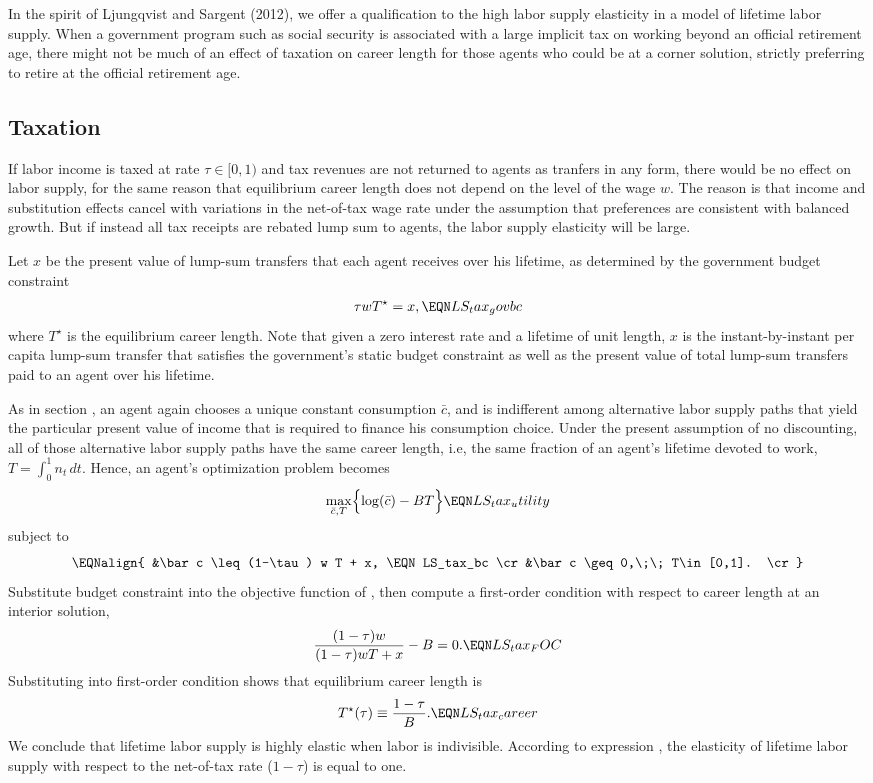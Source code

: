 In the spirit of  Ljungqvist and Sargent (2012), we offer a
qualification to the high labor supply elasticity in a model of
lifetime labor supply. When a government program such as social
security is associated with a large implicit tax on working beyond an
official retirement age, there might not be much of an effect of
taxation on career length for those agents who could be at a corner
solution, strictly preferring to retire at the official
retirement age.



\subsection{Taxation}\label{sec:LS_tax}%
If labor income is taxed at rate $\tau\in [0,1)$ and tax revenues
are not returned to agents as tranfers in any form, there would
be no effect on labor supply, for the same reason that equilibrium
career length  does not depend on the level of the
wage $w$. The reason is that income and substitution effects cancel
with variations in the net-of-tax wage rate under the assumption
that preferences are consistent with balanced growth. But if instead
all tax receipts are rebated lump sum to agents, the labor supply
elasticity will be large.

Let $x$ be the present value of lump-sum transfers that each agent
receives over his lifetime, as determined by the government budget
constraint
$$
\tau w T^\star  = x,                             \EQN LS_tax_govbc
$$
where $T^\star$ is the equilibrium career length. Note that given a
zero interest rate and a lifetime of unit length, $x$ is  the
instant-by-instant per capita lump-sum transfer that satisfies the
government's static budget constraint  as well as
the present value of total lump-sum transfers paid to an agent over
his lifetime.

As in section , an agent again chooses a unique
constant consumption $\bar c$, and is indifferent among alternative labor
supply paths that yield the particular present value of income that is
required to finance his consumption choice. Under the present
assumption of no discounting, all of those alternative labor supply
paths have the same career length, i.e, the same fraction of an
agent's lifetime devoted to work, $T = \int_0^1 n_t\, dt$. Hence,
an agent's optimization problem becomes
$$
\max_{\bar c, T} \Bigl\{ \log(\bar c) - BT \Bigr\}   \EQN LS_tax_utility
$$
subject to
$$\EQNalign{
&\bar c \leq (1-\tau) w T + x,            \EQN LS_tax_bc   \cr
&\bar c \geq 0,\;\; T\in[0,1].  \cr}
$$
Substitute budget constraint  into the objective
function of , then
compute a first-order condition with respect to career length at
an interior solution,
$$
{(1-\tau)w \over (1-\tau)wT + x}-B =0.    \EQN LS_tax_FOC
$$
Substituting  into first-order condition
 shows that  equilibrium career length is
$$
T^\star(\tau) \equiv {1-\tau \over B}.    \EQN LS_tax_career
$$
We conclude that lifetime labor supply is highly elastic when labor
is indivisible. According to expression , the
elasticity of lifetime labor supply with respect to the net-of-tax
rate ($1-\tau$) is equal to one.

